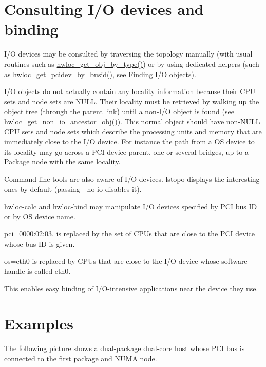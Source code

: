  \hypertarget{a00384_iodevices_consult}{}\section{Consulting I/\+O devices and binding}\label{a00384_iodevices_consult}
I/O devices may be consulted by traversing the topology manually (with usual routines such as \hyperlink{a00187_ga6f414dd80a2b943967a0ac92da3181a2}{hwloc\+\_\+get\+\_\+obj\+\_\+by\+\_\+type()}) or by using dedicated helpers (such as \hyperlink{a00204_gacdbaf0db98872e224b7883a84bfb0455}{hwloc\+\_\+get\+\_\+pcidev\+\_\+by\+\_\+busid()}, see \hyperlink{a00204}{Finding I/O objects}).

I/O objects do not actually contain any locality information because their C\+PU sets and node sets are N\+U\+LL. Their locality must be retrieved by walking up the object tree (through the {\ttfamily parent} link) until a non-\/\+I/O object is found (see \hyperlink{a00204_gaf139bb61375178e90cc3f1835b452ab6}{hwloc\+\_\+get\+\_\+non\+\_\+io\+\_\+ancestor\+\_\+obj()}). This normal object should have non-\/\+N\+U\+LL C\+PU sets and node sets which describe the processing units and memory that are immediately close to the I/O device. For instance the path from a OS device to its locality may go across a P\+CI device parent, one or several bridges, up to a Package node with the same locality.

Command-\/line tools are also aware of I/O devices. lstopo displays the interesting ones by default (passing {\ttfamily -\/-\/no-\/io} disables it).

hwloc-\/calc and hwloc-\/bind may manipulate I/O devices specified by P\+CI bus ID or by OS device name. 
\begin{DoxyItemize}
\item {\ttfamily pci=0000\+:02\+:03.} is replaced by the set of C\+P\+Us that are close to the P\+CI device whose bus ID is given.  
\item {\ttfamily os=eth0} is replaced by C\+P\+Us that are close to the I/O device whose software handle is called {\ttfamily eth0}.  
\end{DoxyItemize}This enables easy binding of I/\+O-\/intensive applications near the device they use.

 \hypertarget{a00384_iodevices_examples}{}\section{Examples}\label{a00384_iodevices_examples}
The following picture shows a dual-\/package dual-\/core host whose P\+CI bus is connected to the first package and N\+U\+MA node.

